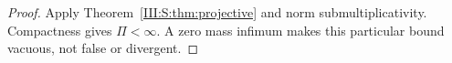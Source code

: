 \begin{proof}
Apply Theorem~\ref{III:S:thm:projective} and norm submultiplicativity. Compactness gives $\Pi<\infty$. A zero mass infimum makes this particular bound vacuous, not false or divergent.
\end{proof}
